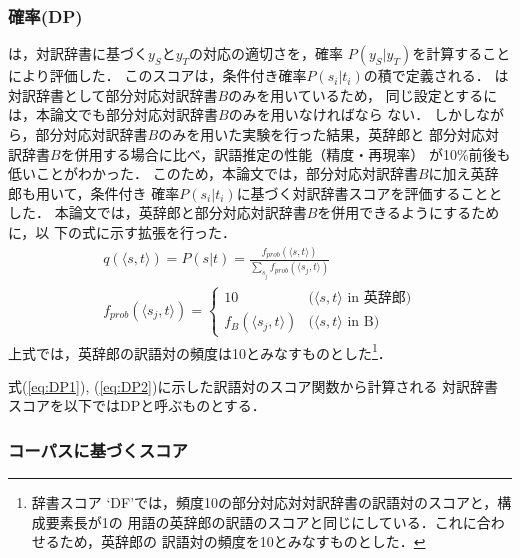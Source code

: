 \documentclass[japanese]{jnlp_1.3a}
\begin{document}
\subsubsection*{確率(DP)}
\cite{Fujii00}は，対訳辞書に基づく$y_S$と$y_T$の対応の適切さを，確率
$P(y_S|y_T)$を計算することにより評価した．
このスコアは，条件付き確率$P(s_i|t_i)$の積で定義される．
\cite{Fujii00}は対訳辞書として部分対応対訳辞書$B$のみを用いているため，
同じ設定とするには，本論文でも部分対応対訳辞書$B$のみを用いなければなら
ない．
しかしながら，部分対応対訳辞書$B$のみを用いた実験を行った結果，英辞郎と
部分対応対訳辞書$B$を併用する場合に比べ，訳語推定の性能（精度・再現率）
が10\%前後も低いことがわかった．
このため，本論文では，部分対応対訳辞書$B$に加え英辞郎も用いて，条件付き
確率$P(s_i|t_i)$に基づく対訳辞書スコアを評価することとした．
本論文では，英辞郎と部分対応対訳辞書$B$を併用できるようにするために，以
下の式に示す拡張を行った．
\begin{eqnarray}
 & q(\langle s,t\rangle) = P(s|t) = \frac{f_{prob}(\langle
  s,t\rangle)}{\sum_{s_j}f_{prob}(\langle s_j,t\rangle)} & \label{eq:DP1}\\
 & f_{prob}(\langle s_j,t\rangle) = 
  \begin{cases}
		   10 & \text{($\langle s,t\rangle$ in 英辞郎)} \\
		   f_B(\langle s_j,t\rangle) & \text{($\langle s,t\rangle$ in B)} 
				     
  \end{cases} & \label{eq:DP2}
\end{eqnarray}
上式では，英辞郎の訳語対の頻度は10とみなすものとした\footnote{辞書スコア
`DF'では，頻度10の部分対応対対訳辞書の訳語対のスコアと，構成要素長が1の
用語の英辞郎の訳語のスコアと同じにしている．これに合わせるため，英辞郎の
訳語対の頻度を10とみなすものとした．}．

式(\ref{eq:DP1}), (\ref{eq:DP2})に示した訳語対のスコア関数から計算される
対訳辞書スコアを以下ではDPと呼ぶものとする．


\subsubsection{コーパスに基づくスコア}
\label{sec:corpus_score}
\end{document}
